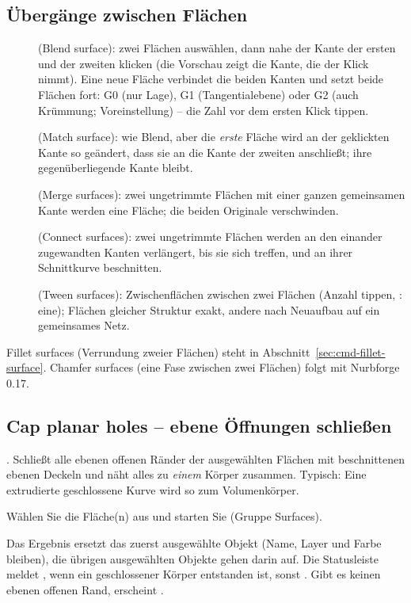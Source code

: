 \subsection{Übergänge zwischen Flächen}\label{sec:cmd-blends}
\begin{description}
\item[] (Blend surface): zwei Flächen auswählen, dann nahe der Kante der ersten und
  der zweiten klicken (die Vorschau zeigt die Kante, die der Klick nimmt). Eine neue Fläche
  verbindet die beiden Kanten und setzt beide Flächen fort: G0 (nur Lage), G1 (Tangentialebene)
  oder G2 (auch Krümmung; Voreinstellung) -- die Zahl vor dem ersten Klick tippen.
\item[] (Match surface): wie Blend, aber die \emph{erste} Fläche wird an der
  geklickten Kante so geändert, dass sie an die Kante der zweiten anschließt; ihre gegenüberliegende
  Kante bleibt.
\item[] (Merge surfaces): zwei ungetrimmte Flächen mit einer ganzen gemeinsamen
  Kante werden eine Fläche; die beiden Originale verschwinden.
\item[] (Connect surfaces): zwei ungetrimmte Flächen werden an den einander
  zugewandten Kanten verlängert, bis sie sich treffen, und an ihrer Schnittkurve beschnitten.
\item[] (Tween surfaces): Zwischenflächen zwischen zwei Flächen (Anzahl tippen,
  : eine); Flächen gleicher Struktur exakt, andere nach Neuaufbau auf ein gemeinsames
  Netz.
\end{description}
Fillet surfaces (Verrundung zweier Flächen) steht in Abschnitt~\ref{sec:cmd-fillet-surface}. Chamfer
surfaces (eine Fase zwischen zwei Flächen) folgt mit Nurbforge 0.17.

\subsection{Cap planar holes -- ebene Öffnungen schließen}\label{sec:cmd-cap}
. Schließt alle ebenen offenen Ränder der ausgewählten Flächen mit beschnittenen
ebenen Deckeln und näht alles zu \emph{einem} Körper zusammen. Typisch: Eine extrudierte
geschlossene Kurve wird so zum Volumenkörper.
\begin{schritte}
\item Wählen Sie die Fläche(n) aus und starten Sie  (Gruppe Surfaces).
\end{schritte}
Das Ergebnis ersetzt das zuerst ausgewählte Objekt (Name, Layer und Farbe bleiben), die übrigen
ausgewählten Objekte gehen darin auf. Die Statusleiste meldet
, wenn ein geschlossener Körper entstanden ist, sonst
. Gibt es keinen ebenen offenen Rand, erscheint
.

